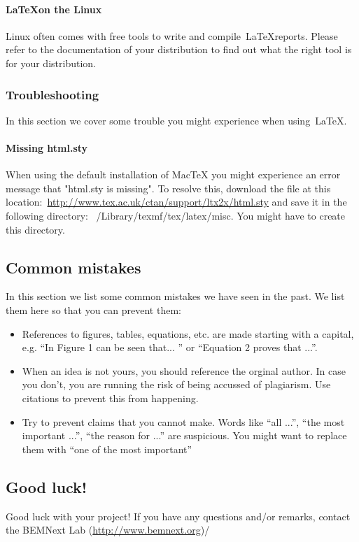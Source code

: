 \documentclass{latex-format/stylesheets/BEMNextstyle}
\begin{document}
\paragraph*{\LaTeX on the Linux}
Linux often comes with free tools to write and compile~\LaTeX reports. Please refer to the documentation of your distribution to find out what the right tool is for your distribution.

\subsubsection*{Troubleshooting}
In this section we cover some trouble you might experience when using~\LaTeX.

\paragraph*{Missing html.sty}
When using the default installation of MacTeX you might experience an error message that "html.sty is missing". To resolve this, download the file at this location:~\url{http://www.tex.ac.uk/ctan/support/ltx2x/html.sty} and save it in the following directory: ~/Library/texmf/tex/latex/misc. You might have to create this directory.

\subsection*{Common mistakes}
In this section we list some common mistakes we have seen in the past. We list them here so that you can prevent them:
\begin{itemize}
\item References to figures, tables, equations, etc. are made starting with a capital, e.g. ``In Figure 1 can be seen that... '' or ``Equation 2 proves that ...''.
\item When an idea is not yours, you should reference the orginal author. In case you don't, you are running the risk of being accussed of plagiarism. Use citations to prevent this from happening.
\item Try to prevent claims that you cannot make. Words like ``all ...'', ``the most important ...'', ``the reason for ...'' are suspicious. You might want to replace them with ``one of the most important''
\end{itemize}

\subsection*{Good luck!}
Good luck with your project! If you have any questions and/or remarks, contact the BEMNext Lab (\url{http://www.bemnext.org})/
\end{document}
